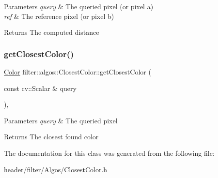 \begin{DoxyParams}{Parameters}
{\em query} & The queried pixel (or pixel a) \\
\hline
{\em ref} & The reference pixel (or pixel b) \\
\hline
\end{DoxyParams}
\begin{DoxyReturn}{Returns}
The computed distance 
\end{DoxyReturn}
\mbox{\label{classfilter_1_1algos_1_1_closest_color_a30005f784dfc4d74e5ebd4f67dd85bd7}} 
\subsubsection{\texorpdfstring{get\+Closest\+Color()}{getClosestColor()}}
{\footnotesize\ttfamily \hyperlink{structfilter_1_1algos_1_1_closest_color_1_1_color}{Color} filter\+::algos\+::\+Closest\+Color\+::get\+Closest\+Color (\begin{DoxyParamCaption}\item[{const cv\+::\+Scalar \&}]{query }\end{DoxyParamCaption})\hspace{0.3cm}{\ttfamily [inline]}, {\ttfamily [private]}}


\begin{DoxyParams}{Parameters}
{\em query} & The queried pixel \\
\hline
\end{DoxyParams}
\begin{DoxyReturn}{Returns}
The closest found color 
\end{DoxyReturn}


The documentation for this class was generated from the following file\+:\begin{DoxyCompactItemize}
\item 
header/filter/\+Algos/Closest\+Color.\+h\end{DoxyCompactItemize}
